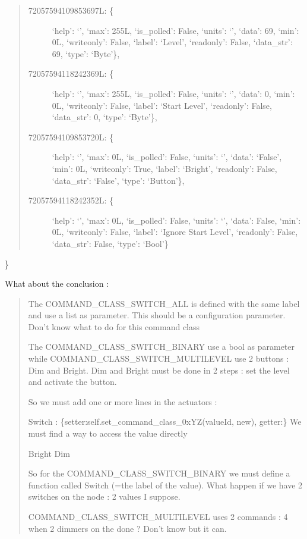 \documentclass[letterpaper,10pt,english]{sphinxmanual}
\begin{document}
\begin{fulllineitems}
\begin{quote}
\begin{description}
\item[{72057594109853697L: \{}] \leavevmode
`help': `',
`max': 255L,
`is\_polled': False,
`units': `',
`data': 69,
`min': 0L,
`writeonly': False,
`label': `Level',
`readonly': False,
`data\_str': 69,
`type': `Byte'\},

\item[{72057594118242369L: \{}] \leavevmode
`help': `',
`max': 255L,
`is\_polled': False,
`units': `',
`data': 0,
`min': 0L,
`writeonly': False,
`label': `Start Level',
`readonly': False,
`data\_str': 0,
`type': `Byte'\},

\item[{72057594109853720L: \{}] \leavevmode
`help': `',
`max': 0L,
`is\_polled': False,
`units': `',
`data': `False',
`min': 0L,
`writeonly': True,
`label': `Bright',
`readonly': False,
`data\_str': `False',
`type': `Button'\},

\item[{72057594118242352L: \{}] \leavevmode
`help': `',
`max': 0L,
`is\_polled': False,
`units': `',
`data': False,
`min': 0L,
`writeonly': False,
`label': `Ignore Start Level',
`readonly': False,
`data\_str': False,
`type': `Bool'\}

\end{description}
\end{quote}

\}

What about the conclusion :
\begin{quote}

The COMMAND\_CLASS\_SWITCH\_ALL is defined with the same label and
use a list as parameter. This should be a configuration parameter.
Don't know what to do for this command class

The COMMAND\_CLASS\_SWITCH\_BINARY use a bool as parameter while
COMMAND\_CLASS\_SWITCH\_MULTILEVEL use 2 buttons : Dim and Bright.
Dim and Bright must be done in 2 steps : set the level and activate
the button.

So we must add one or more lines in the actuators :

Switch : \{setter:self.set\_command\_class\_0xYZ(valueId, new), getter:\}
We must find a way to access the value directly

Bright
Dim

So for the COMMAND\_CLASS\_SWITCH\_BINARY we must define a function called
Switch (=the label of the value). What happen if we have 2 switches
on the node : 2 values I suppose.

COMMAND\_CLASS\_SWITCH\_MULTILEVEL uses 2 commands : 4 when 2 dimmers on the
done ? Don't know but it can.


\end{quote}
\end{fulllineitems}
\end{document}
